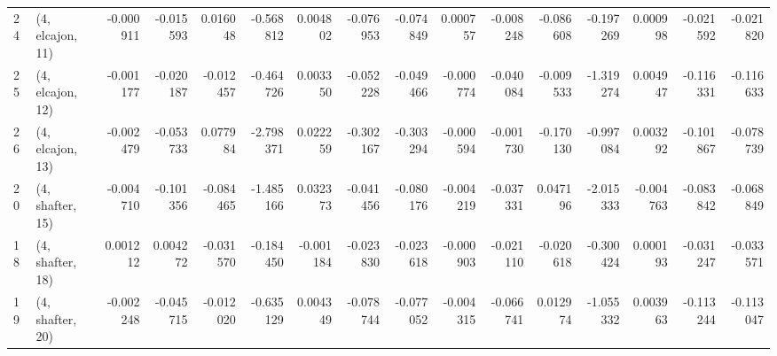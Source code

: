 \begin{tabular}{llrrrrrrrrrrrrrr}
24 &  (4, elcajon, 11) &  -0.000911 & -0.015593 &  0.016048 &  -0.568812 &  0.004802 &  -0.076953 & -0.074849 &  0.000757 & -0.008248 & -0.086608 &  -0.197269 &  0.000998 & -0.021592 & -0.021820 \\
25 &  (4, elcajon, 12) &  -0.001177 & -0.020187 & -0.012457 &  -0.464726 &  0.003350 &  -0.052228 & -0.049466 & -0.000774 & -0.040084 & -0.009533 &  -1.319274 &  0.004947 & -0.116331 & -0.116633 \\
26 &  (4, elcajon, 13) &  -0.002479 & -0.053733 &  0.077984 &  -2.798371 &  0.022259 &  -0.302167 & -0.303294 & -0.000594 & -0.001730 & -0.170130 &  -0.997084 &  0.003292 & -0.101867 & -0.078739 \\
20 &  (4, shafter, 15) &  -0.004710 & -0.101356 & -0.084465 &  -1.485166 &  0.032373 &  -0.041456 & -0.080176 & -0.004219 & -0.037331 &  0.047196 &  -2.015333 & -0.004763 & -0.083842 & -0.068849 \\
18 &  (4, shafter, 18) &   0.001212 &  0.004272 & -0.031570 &  -0.184450 & -0.001184 &  -0.023830 & -0.023618 & -0.000903 & -0.021110 & -0.020618 &  -0.300424 &  0.000193 & -0.031247 & -0.033571 \\
19 &  (4, shafter, 20) &  -0.002248 & -0.045715 & -0.012020 &  -0.635129 &  0.004349 &  -0.078744 & -0.077052 & -0.004315 & -0.066741 &  0.012974 &  -1.055332 &  0.003963 & -0.113244 & -0.113047 \\
\bottomrule
\end{tabular}
